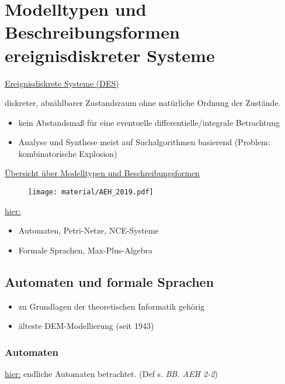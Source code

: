 \section{Modelltypen und Beschreibungsformen ereignisdiskreter Systeme}

\underline{Ereignisdiskrete Systeme (DES)}

diskreter, abzählbarer Zustandsraum ohne natürliche Ordnung der Zustände.
\begin{itemize}
	\item kein Abstandsmaß für eine eventuelle differentielle/integrale Betrachtung
	\item Analyse und Synthese meist auf Suchalgorithmen basierend (Problem: kombinatorische Explosion)
\end{itemize}

\underline{Übersicht über Modelltypen und Beschreibungsformen}
\begin{figure}[H]
	\centering
	\texttt{[image: material/AEH\_2019.pdf]}
\end{figure}





\underline{hier:}

\begin{itemize}
	\item Automaten, Petri-Netze, NCE-Systeme
	\item Formale Sprachen, Max-Plus-Algebra
\end{itemize}

\subsection{Automaten und formale Sprachen}
\begin{itemize}
	\item zu Grundlagen der theoretischen Informatik gehörig
	\item älteste DEM-Modellierung (seit 1943)
\end{itemize}

\subsubsection{Automaten}
\underline{hier:} endliche Automaten betrachtet. (Def s. \textit{BB. AEH 2-2})

